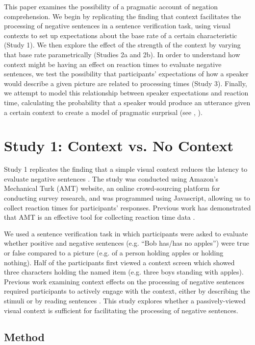 \documentclass[10pt,letterpaper]{article}
\begin{document}
This paper examines the possibility of a pragmatic account of negation comprehension.  We begin by replicating the finding that context facilitates the processing of negative sentences in a sentence verification task, using visual contexts to set up expectations about the base rate of a certain characteristic (Study 1).  We then explore the effect of the strength of the context by varying that base rate parametrically (Studies 2a and 2b).  In order to understand how context might be having an effect on reaction times to evaluate negative sentences, we test the possibility that participants' expectations of how a speaker would describe a given picture are related to processing times (Study 3).  Finally, we attempt to model this relationship between speaker expectations and reaction time, calculating the probability that a speaker would produce an utterance given a certain context to create a model of pragmatic surprisal (see , ).  

\section{Study 1: Context vs. No Context}
Study 1 replicates the finding that a simple visual context reduces the latency to evaluate negative sentences \cite{wason1965}.  The study was conducted using Amazon's Mechanical Turk (AMT) website, an online crowd-sourcing platform for conducting survey research, and was programmed using Javascript, allowing us to collect reaction times for participants' responses.  Previous work has 
demonstrated that AMT is an effective tool for collecting reaction time data \cite{crump2013}.  

We used a sentence verification task in which participants were asked to evaluate whether positive and negative sentences (e.g. ``Bob has/has no apples'') were true or false compared to a picture (e.g. of a person holding apples or holding nothing).  Half of the participants first viewed a context screen which showed three characters holding the named item (e.g. three boys standing with apples).  Previous work examining context effects on the processing of negative sentences required participants to actively engage with the context, either by describing the stimuli \cite{wason1965} or by reading sentences \cite{glenberg1999, ludtke2006, dale2011}.  This study explores whether a passively-viewed visual context is sufficient for facilitating the processing of negative sentences.  
\subsection{Method}
\end{document}
